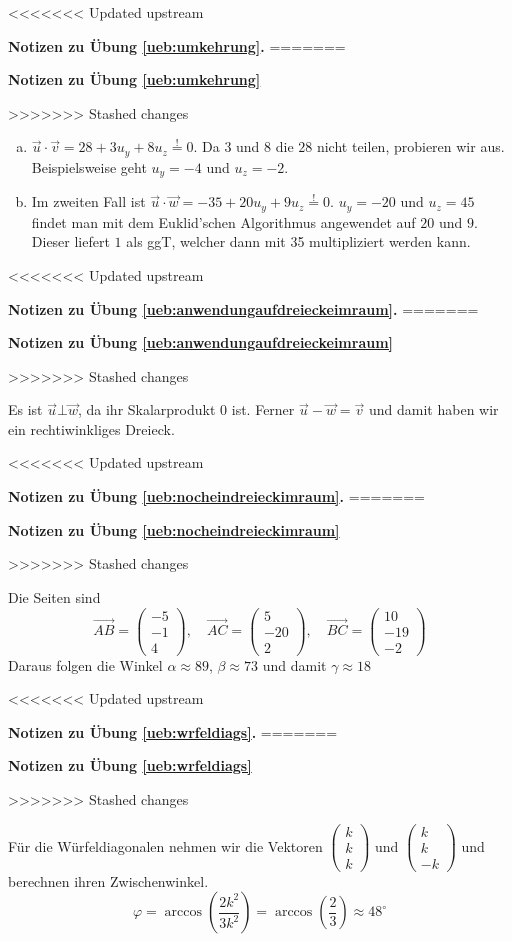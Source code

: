 \documentclass[%
11pt,%
twoside,%
titlepage,%
<<<<<<< Updated upstream
german,%
=======
swissgerman,%
>>>>>>> Stashed changes
headsepline%
]{scrartcl}
\newcommand{\faReturnGray}{\textcolor{gray}{\faMailReply}} %
\theoremstyle{definition}
\theoremstyle{plain}
\newcommand{\concatueb}[1]{ueb:#1}%
\newcommand{\concatlsg}[1]{lsg:#1}%
\newenvironment{lsg}[1]{%
<<<<<<< Updated upstream
    \par\noindent\textbf{Notizen zu Übung \ref{\concatueb{#1}}.}%
    \label{\concatlsg{#1}}
=======
    \par\noindent\textbf{Notizen zu Übung \ref{\concatueb{#1}}}\label{\concatlsg{#1}}
    \hfill\hyperref[\concatueb{#1}]{\faReturnGray}\par %
>>>>>>> Stashed changes
}{%
    \par%
}
\begin{document}
\begin{lsg}{umkehrung}
\begin{enumerate}[a)]
    \item $\vec{u}\cdot\vec{v}=28+3u_y+8u_z\stackrel{!}{=}0$. Da $3$ und $8$ die $28$ nicht teilen, probieren wir aus. Beispielsweise geht $u_y=-4$ und $u_z=-2$.
    \item Im zweiten Fall ist $\vec{u}\cdot\vec{w}=-35+20u_y+9u_z\stackrel{!}{=}0$. $u_y=-20$ und $u_z=45$ findet man mit dem Euklid'schen Algorithmus angewendet auf $20$ und $9$. Dieser liefert $1$ als ggT, welcher dann mit 35 multipliziert werden kann.
\end{enumerate}
\end{lsg}
\begin{lsg}{anwendungaufdreieckeimraum}
Es ist $\vec{u}\bot\vec{w}$, da ihr Skalarprodukt $0$ ist. Ferner $\vec{u}-\vec{w}=\vec{v}$ und damit haben wir ein rechtiwinkliges Dreieck.
\end{lsg}
\begin{lsg}{nocheindreieckimraum}
Die Seiten sind
$$\vec{AB}=\begin{pmatrix}
    -5\\-1\\4
\end{pmatrix},\quad \vec{AC}=\begin{pmatrix}
    5\\-20\\2
\end{pmatrix},\quad \vec{BC}=\begin{pmatrix}
    10\\-19\\-2
\end{pmatrix}$$
Daraus folgen die Winkel $\alpha\approx89$, $\beta\approx73$ und damit $\gamma\approx18$
\end{lsg}
\begin{lsg}{wrfeldiags}
Für die Würfeldiagonalen nehmen wir die Vektoren $\begin{pmatrix}
    k\\k\\k
\end{pmatrix}$ und $\begin{pmatrix}
    k\\k\\-k
\end{pmatrix}$
und berechnen ihren Zwischenwinkel.
$$\varphi=\arccos\left(\frac{2k^2}{3k^2}\right)=\arccos\left(\frac{2}{3}\right)\approx48^\circ$$
\end{lsg}
\end{document}
